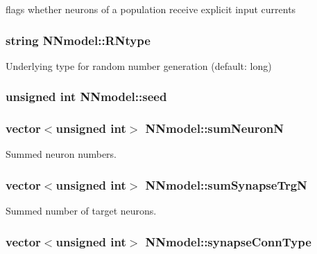 flags whether neurons of a population receive explicit input currents 

\hypertarget{classNNmodel_ae02892a44b18e3ce913dc43dc31dd380}{
\subsubsection[{R\+Ntype}]{\setlength{\rightskip}{0pt plus 5cm}string N\+Nmodel\+::\+R\+Ntype}}\label{classNNmodel_ae02892a44b18e3ce913dc43dc31dd380}


Underlying type for random number generation (default\+: long) 

\hypertarget{classNNmodel_ad82f4dbcf4cc6a942965f9ecaa79616a}{
\subsubsection[{seed}]{\setlength{\rightskip}{0pt plus 5cm}unsigned int N\+Nmodel\+::seed}}\label{classNNmodel_ad82f4dbcf4cc6a942965f9ecaa79616a}
\hypertarget{classNNmodel_a84cf2761cf76d70a06f871a77e64c0b4}{
\subsubsection[{sum\+Neuron\+N}]{\setlength{\rightskip}{0pt plus 5cm}vector$<$unsigned int$>$ N\+Nmodel\+::sum\+Neuron\+N}}\label{classNNmodel_a84cf2761cf76d70a06f871a77e64c0b4}


Summed neuron numbers. 

\hypertarget{classNNmodel_a03e34fda1008acf6379f80e8d713d41b}{
\subsubsection[{sum\+Synapse\+Trg\+N}]{\setlength{\rightskip}{0pt plus 5cm}vector$<$unsigned int$>$ N\+Nmodel\+::sum\+Synapse\+Trg\+N}}\label{classNNmodel_a03e34fda1008acf6379f80e8d713d41b}


Summed number of target neurons. 

\hypertarget{classNNmodel_a0b1d2c6f24b8ed9215dce9daf3ca0518}{
\subsubsection[{synapse\+Conn\+Type}]{\setlength{\rightskip}{0pt plus 5cm}vector$<$unsigned int$>$ N\+Nmodel\+::synapse\+Conn\+Type}}\label{classNNmodel_a0b1d2c6f24b8ed9215dce9daf3ca0518}


